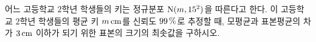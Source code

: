 어느 고등학교 $2$학년 학생들의 키는 정규분포 $\mathrm{N}(m{,}\mkern3mu\mathopen{}15^2)$을 따른다고 한다. 이 고등학교 $2$학년 학생들의 평균 키 $m\mkern3mu \mathrm{cm}$를 신뢰도 $99\mkern3mu \%$로 추정할 때, 모평균과 표본평균의 차가 $3\mkern3mu \mathrm{cm}$ 이하가 되기 위한 표본의 크기의 최솟값을 구하시오. 
